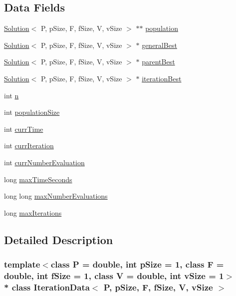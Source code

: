 \subsection*{Data Fields}
\begin{DoxyCompactItemize}
\item 
\hyperlink{classSolution}{Solution}$<$ P, p\+Size, F, f\+Size, V, v\+Size $>$ $\ast$$\ast$ \hyperlink{structIterationData_a1f3b9d4dd52556507d2ec1a11c2ce6c4}{population}
\item 
\hyperlink{classSolution}{Solution}$<$ P, p\+Size, F, f\+Size, V, v\+Size $>$ $\ast$ \hyperlink{structIterationData_a537b9ef402a8f1f5a0e7f017e698e61b}{general\+Best}
\item 
\hyperlink{classSolution}{Solution}$<$ P, p\+Size, F, f\+Size, V, v\+Size $>$ $\ast$ \hyperlink{structIterationData_a390c6765ad4283ec89bba56ba33f27a2}{parent\+Best}
\item 
\hyperlink{classSolution}{Solution}$<$ P, p\+Size, F, f\+Size, V, v\+Size $>$ $\ast$ \hyperlink{structIterationData_a2fd9659d2ca4c7df24c31bb01c261704}{iteration\+Best}
\item 
int \hyperlink{structIterationData_a6099161959b928a1b4aeecbb46b9e407}{n}
\item 
int \hyperlink{structIterationData_a8bd76977404cbdfc9ab671c566aed418}{population\+Size}
\item 
int \hyperlink{structIterationData_ade4c00fea568ba6547b46d39da98ca95}{curr\+Time}
\item 
int \hyperlink{structIterationData_a4868b1453ea6cb512ca4b3b91aa9aa46}{curr\+Iteration}
\item 
int \hyperlink{structIterationData_a3ebd4afd41be1657a42d79b053896a43}{curr\+Number\+Evaluation}
\item 
long \hyperlink{structIterationData_ad10e22f3597e2ac59de07a3d60ed4eb6}{max\+Time\+Seconds}
\item 
long long \hyperlink{structIterationData_a0c2c484b02710ac2e48221114e027dc6}{max\+Number\+Evaluations}
\item 
long \hyperlink{structIterationData_a9baa0b37d2e5b38e5e82d3c6fc8dcacf}{max\+Iterations}
\end{DoxyCompactItemize}


\subsection{Detailed Description}
\subsubsection*{template$<$class P = double, int p\+Size = 1, class F = double, int f\+Size = 1, class V = double, int v\+Size = 1$>$\\*
class Iteration\+Data$<$ P, p\+Size, F, f\+Size, V, v\+Size $>$}

